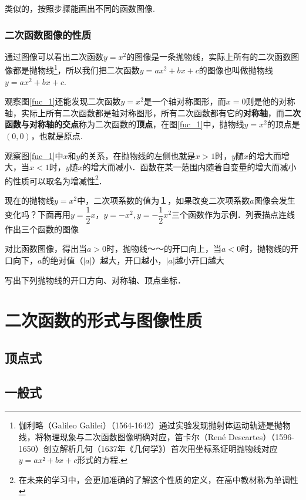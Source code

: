 \documentclass[lang=cn, 10pt, titlestyle=display, oneside]{elegantbook}
\begin{document}
类似的，按照步骤能画出不同的函数图像.
\par
\subsubsection{二次函数图像的性质}
通过图像可以看出二次函数\(y=x^2\)的图像是一条抛物线，实际上所有的二次函数图像都是抛物线\footnote{伽利略（Galileo Galilei）（1564-1642）通过实验发现抛射体运动轨迹是抛物线，将物理现象与二次函数图像明确对应，笛卡尔（René Descartes）（1596-1650）创立解析几何（1637年《几何学》）首次用坐标系证明抛物线对应\(y=ax²+bx+c\)形式的方程.}，所以我们把二次函数\(y=ax^2+bx+c\)的图像也叫做抛物线\(y=ax^2+bx+c\).
\par
观察图\ref{fuc_1}还能发现二次函数\(y=x^2\)是一个轴对称图形，而\(x=0\)则是他的对称轴，实际上所有二次函数都是轴对称图形，所有二次函数都有它的\textbf{对称轴}，而\textbf{二次函数与对称轴的交点}称为二次函数的\textbf{顶点}，在图\ref{fuc_1}中，抛物线\(y=x^2\)的顶点是\((0,0)\)，也就是原点.
\par
观察图\ref{fuc_1}中\(x\)和\(y\)的关系，在抛物线的左侧也就是\(x>1\)时，\(y\)随\(x\)的增大而增大，当\(x<1\)时，\(y\)随\(x\)的增大而减小．函数在某一范围内随着自变量的增大而减小的性质可以取名为增减性\footnote{在未来的学习中，会更加准确的了解这个性质的定义，在高中教材称为单调性}．
\par
现在的抛物线$y=x^2$中，二次项系数的值为１，如果改变二次项系数$a$图像会发生变化吗？下面再用\(y=\dfrac{1}{2}x，y=-x^2, y=-\dfrac{1}{2}x^2\)三个函数作为示例．列表描点连线作出三个函数的图像
\par
对比函数图像，得出当\(a>0\)时，抛物线～～的开口向上，当$a<0$时，抛物线的开口向下，\(a\)的绝对值（$|a|$）越大，开口越小，$|a|$越小开口越大

\begin{example}
    写出下列抛物线的开口方向、对称轴、顶点坐标．
\end{example}

\section{二次函数的形式与图像性质}

\subsection{顶点式}


\subsection{一般式}
\end{document}
